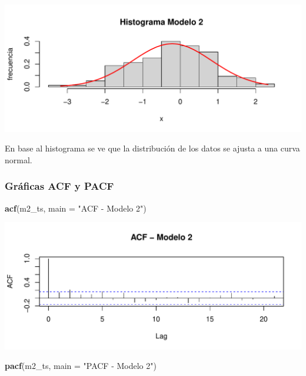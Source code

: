 \documentclass[
  11pt,
]{article}
\newenvironment{Shaded}{\begin{snugshade}}{\end{snugshade}}
\newcommand{\DataTypeTok}[1]{\textcolor[rgb]{0.13,0.29,0.53}{#1}}
\newcommand{\KeywordTok}[1]{\textcolor[rgb]{0.13,0.29,0.53}{\textbf{#1}}}
\newcommand{\NormalTok}[1]{#1}
\newcommand{\StringTok}[1]{\textcolor[rgb]{0.31,0.60,0.02}{#1}}
\begin{document}
\begin{center}\includegraphics[width=0.9\linewidth]{RmdFigs/histograma_m2-1} \end{center}

En base al histograma se ve que la distribución de los datos se ajusta a
una curva normal.

\hypertarget{gruxe1ficas-acf-y-pacf}{%
\subsubsection{Gráficas ACF y PACF}\label{gruxe1ficas-acf-y-pacf}}

\begin{Shaded}
\begin{Highlighting}[]
\KeywordTok{acf}\NormalTok{(m2_ts, }\DataTypeTok{main =} \StringTok{"ACF - Modelo 2"}\NormalTok{)}
\end{Highlighting}
\end{Shaded}

\begin{center}\includegraphics[width=0.9\linewidth]{RmdFigs/acfM2-1} \end{center}

\begin{Shaded}
\begin{Highlighting}[]
\KeywordTok{pacf}\NormalTok{(m2_ts, }\DataTypeTok{main =} \StringTok{"PACF - Modelo 2"}\NormalTok{)}
\end{Highlighting}
\end{Shaded}
\end{document}
